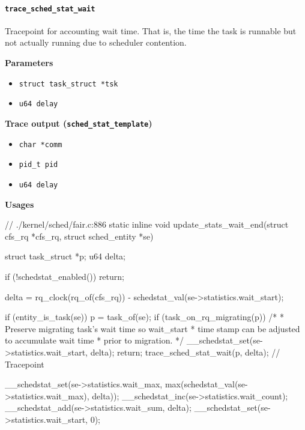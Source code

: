 \paragraph{\texttt{trace\_sched\_stat\_wait}}
Tracepoint for accounting wait time. That is, the time the task is runnable but not actually running due to scheduler contention.

\textbf{Parameters}
\begin{itemize}
    \item \verb|struct task_struct *tsk|
    \item \verb|u64 delay|
\end{itemize}

\textbf{Trace output (\texttt{sched\_stat\_template})}
\begin{itemize}
    \item \verb|char *comm|
    \item \verb|pid_t pid|
    \item \verb|u64 delay|
\end{itemize}

\textbf{Usages}
\begin{code}
// ./kernel/sched/fair.c:886
static inline void
update_stats_wait_end(struct cfs_rq *cfs_rq, struct sched_entity *se){
	struct task_struct *p;
	u64 delta;

	if (!schedstat_enabled())
		return;

	delta = rq_clock(rq_of(cfs_rq)) - schedstat_val(se->statistics.wait_start);

	if (entity_is_task(se)) {
		p = task_of(se);
		if (task_on_rq_migrating(p)) {
			/*
			 * Preserve migrating task's wait time so wait_start
			 * time stamp can be adjusted to accumulate wait time
			 * prior to migration.
			 */
			__schedstat_set(se->statistics.wait_start, delta);
			return;
		}
		trace_sched_stat_wait(p, delta); // Tracepoint
	}

	__schedstat_set(se->statistics.wait_max,
		      max(schedstat_val(se->statistics.wait_max), delta));
	__schedstat_inc(se->statistics.wait_count);
	__schedstat_add(se->statistics.wait_sum, delta);
	__schedstat_set(se->statistics.wait_start, 0);
}
\end{code}

